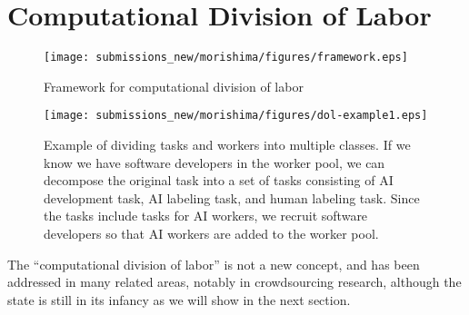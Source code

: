 \section{Computational Division of Labor}
\label{sec:computationaldivisionoflabor}


\begin{figure}[t]
    \centering
    \texttt{[image: submissions\_new/morishima/figures/framework.eps]}
    \caption{Framework for computational division of labor}
    \label{fig:framework}
\end{figure}

\begin{figure}[t]
    \centering
    \texttt{[image: submissions\_new/morishima/figures/dol-example1.eps]}
    \caption{Example of dividing tasks and workers into multiple classes. If we know we have software developers in the worker pool, we can decompose the original task into a set of tasks consisting of AI development task, AI labeling task, and human labeling task. Since the tasks include tasks for AI workers, we recruit software developers so that AI workers are added to the worker pool.}
    \label{fig:example}
\end{figure}

The ``computational division of labor'' is not a new concept, and has been addressed in many related areas, notably in crowdsourcing research, although the state is still in its infancy as we will show in the next section.

